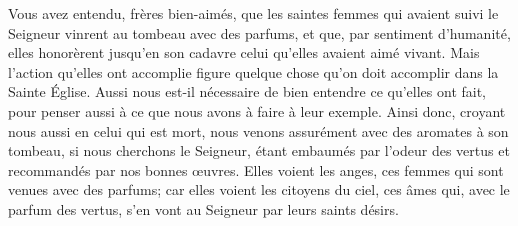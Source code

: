 Vous avez entendu, frères bien-aimés,
	que les saintes femmes qui avaient suivi le Seigneur
	vinrent au tombeau avec des parfums,
	et que, par sentiment d’humanité,
	elles honorèrent jusqu’en son cadavre
		celui qu’elles avaient aimé vivant.
Mais l’action qu’elles ont accomplie
	figure quelque chose qu’on doit accomplir dans la Sainte Église.
Aussi nous est-il nécessaire de bien entendre ce qu’elles ont fait,
	pour penser aussi à ce que nous avons à faire à leur exemple.
Ainsi donc, croyant nous aussi en celui qui est mort,
	nous venons assurément avec des aromates à son tombeau,
		si nous cherchons le Seigneur,
	étant embaumés par l’odeur des vertus et recommandés par nos bonnes œuvres.
Elles voient les anges, ces femmes qui sont venues avec des parfums;
	car elles voient les citoyens du ciel,
	ces âmes qui, avec le parfum des vertus,
		s’en vont au Seigneur par leurs saints désirs.
